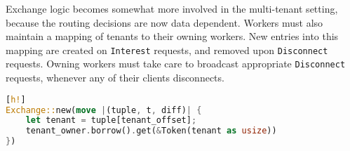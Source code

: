 \documentclass[../index.tex]{subfiles}
\begin{document}
Exchange logic becomes somewhat more involved in the multi-tenant
setting, because the routing decisions are now data dependent. Workers
must also maintain a mapping of tenants to their owning workers. New
entries into this mapping are created on \texttt{Interest} requests,
and removed upon \texttt{Disconnect} requests. Owning workers must
take care to broadcast appropriate \texttt{Disconnect} requests,
whenever any of their clients disconnects.

\begin{lstlisting}[language=Rust, style=colouredRust][h!]
Exchange::new(move |(tuple, t, diff)| {
    let tenant = tuple[tenant_offset];
    tenant_owner.borrow().get(&Token(tenant as usize))
})
\end{lstlisting}
\end{document}
